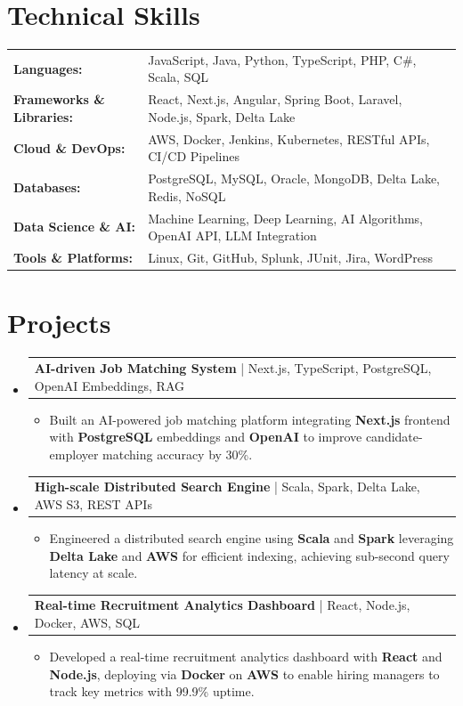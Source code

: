 \documentclass[letterpaper,10pt]{article}
\makeatletter
\newcommand{\resumeItem}[1]{
  \item{\fontsize{8pt}{9pt}\selectfont
    #1 \vspace{-3pt}
  }
}
\newcommand{\resumeProjectHeading}[2]{
    \item
    \begin{tabular*}{1.001\textwidth}{l@{\extracolsep{\fill}}r}
      \fontsize{8.5pt}{10pt}#1 & \textbf{\fontsize{8.5pt}{10pt} #2}\\
    \end{tabular*}\vspace{-7pt}
}
\newcommand{\resumeSubHeadingListStart}{\begin{itemize}[leftmargin=0pt, label={}]}
\newcommand{\resumeSubHeadingListEnd}{\end{itemize}}
\newcommand{\resumeItemListStart}{\begin{itemize}[leftmargin=*]}
\newcommand{\resumeItemListEnd}{\end{itemize}\vspace{-5pt}}
\makeatother
\begin{document}
\section{Technical Skills}
        \vspace{-14pt}
        \begin{table}[h]
            \fontsize{8pt}{9pt}\selectfont
            \begin{tabular}{p{0.3\linewidth} p{0.7\linewidth}}
                \textbf{Languages:} & JavaScript, Java, Python, TypeScript, PHP, C\#, Scala, SQL \\
                \textbf{Frameworks \& Libraries:} & React, Next.js, Angular, Spring Boot, Laravel, Node.js, Spark, Delta Lake \\
                \textbf{Cloud \& DevOps:} & AWS, Docker, Jenkins, Kubernetes, RESTful APIs, CI/CD Pipelines \\
                \textbf{Databases:} & PostgreSQL, MySQL, Oracle, MongoDB, Delta Lake, Redis, NoSQL \\
                \textbf{Data Science \& AI:} & Machine Learning, Deep Learning, AI Algorithms, OpenAI API, LLM Integration \\
                \textbf{Tools \& Platforms:} & Linux, Git, GitHub, Splunk, JUnit, Jira, WordPress \\
            \end{tabular}
        \end{table}
 \vspace{-18pt}

\section{Projects}
    \vspace{-5pt}
    \resumeSubHeadingListStart
          \resumeProjectHeading
            {\textbf{AI-driven Job Matching System} | Next.js, TypeScript, PostgreSQL, OpenAI Embeddings, RAG}{}
            \resumeItemListStart
                \resumeItem{Built an AI-powered job matching platform integrating \textbf{Next.js} frontend with \textbf{PostgreSQL} embeddings and \textbf{OpenAI} to improve candidate-employer matching accuracy by 30\%.}
            \resumeItemListEnd
        \vspace{-12pt}
    
        \resumeProjectHeading
            {\textbf{High-scale Distributed Search Engine} | Scala, Spark, Delta Lake, AWS S3, REST APIs}{}
        \resumeItemListStart
                \resumeItem{Engineered a distributed search engine using \textbf{Scala} and \textbf{Spark} leveraging \textbf{Delta Lake} and \textbf{AWS} for efficient indexing, achieving sub-second query latency at scale.}
        \resumeItemListEnd
      \vspace{-12pt}
      \resumeProjectHeading
        {\textbf{Real-time Recruitment Analytics Dashboard} | React, Node.js, Docker, AWS, SQL}{}
    \resumeItemListStart
            \resumeItem{Developed a real-time recruitment analytics dashboard with \textbf{React} and \textbf{Node.js}, deploying via \textbf{Docker} on \textbf{AWS} to enable hiring managers to track key metrics with 99.9\% uptime.}
    \resumeItemListEnd
    \resumeSubHeadingListEnd
\end{document}
